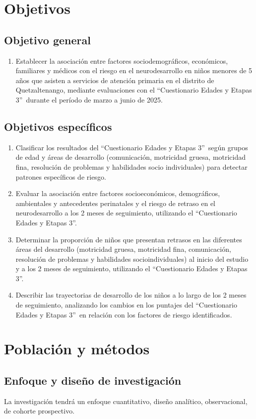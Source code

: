 \documentclass[11pt,letterpaper]{report}
\newcommand{\tiempito}{marzo a junio de 2025}
\newcommand{\asq}{“Cuestionario Edades y Etapas 3”}
\begin{document}
	\chapter{Objetivos}
\section{Objetivo general}
\begin{enumerate}
	\item
Establecer la asociación entre factores sociodemográficos, económicos,
familiares y médicos con el riesgo en el neurodesarrollo en niños menores de 5
años que asisten a servicios de atención primaria en el distrito de
Quetzaltenango, mediante evaluaciones con el \asq\ durante el período de
\tiempito.
\end{enumerate}
\section{Objetivos específicos}
\begin{enumerate}
	\item
Clasificar los resultados del \asq\ según grupos de edad y áreas de desarrollo
(comunicación, motricidad gruesa, motricidad fina, resolución de problemas y
habilidades socio individuales) para detectar patrones específicos de riesgo.
	\item
Evaluar la asociación entre factores socioeconómicos, demográficos, ambientales
y antecedentes perinatales y el riesgo de retraso en el neurodesarrollo a los 2
meses de seguimiento, utilizando el \asq.
	\item
Determinar la proporción de niños que presentan retrasos en las diferentes
áreas del desarrollo (motricidad gruesa, motricidad fina, comunicación,
resolución de problemas y habilidades socioindividuales) al inicio del estudio
y a los 2 meses de seguimiento, utilizando el \asq.
	\item
Describir las trayectorias de desarrollo de los niños a lo largo de los 2 meses
de seguimiento, analizando los cambios en los puntajes del \asq\ en relación
con los factores de riesgo identificados.
\end{enumerate}

	\chapter{Población y métodos}
\section{Enfoque y diseño de investigación}
La investigación tendrá un enfoque cuantitativo, diseño analítico,
observacional, de cohorte prospectivo.
\end{document}
